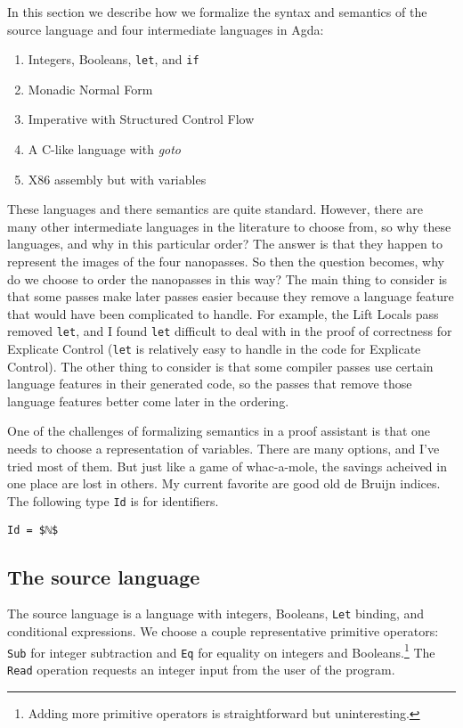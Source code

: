 \documentclass[sigplan,review,dvipsnames,screen,10pt]{acmart}
\begin{document}
In this section we describe how we formalize the syntax and semantics
of the source language and four intermediate languages in Agda:
\begin{enumerate}
\item Integers, Booleans, \texttt{let}, and \texttt{if}
\item Monadic Normal Form
\item Imperative with Structured Control Flow
\item A C-like language with \emph{goto}
\item X86 assembly but with variables
\end{enumerate}
These languages and there semantics are quite standard. However, there
are many other intermediate languages in the literature to choose
from, so why these languages, and why in this particular order?  The
answer is that they happen to represent the images of the four
nanopasses.  So then the question becomes, why do we choose to order
the nanopasses in this way? The main thing to consider is that some
passes make later passes easier because they remove a language feature
that would have been complicated to handle. For example, the Lift
Locals pass removed \texttt{let}, and I found \texttt{let} difficult
to deal with in the proof of correctness for Explicate Control
(\texttt{let} is relatively easy to handle in the code for Explicate
Control). The other thing to consider is that some compiler passes use
certain language features in their generated code, so the passes that
remove those language features better come later in the ordering.

One of the challenges of formalizing semantics in a proof assistant is
that one needs to choose a representation of variables. There are many
options, and I've tried most of them. But just like a game of
whac-a-mole, the savings acheived in one place are lost in others.  My
current favorite are good old de Bruijn indices. The following type
\lstinline{Id} is for identifiers.

\begin{lstlisting}
Id = $ℕ$
\end{lstlisting}

\subsection{The source language}

The source language is a language with integers, Booleans,
\texttt{Let} binding, and conditional expressions. We choose a couple
representative primitive operators: \texttt{Sub} for integer
subtraction and \texttt{Eq} for equality on integers and
Booleans.\footnote{Adding more primitive operators is straightforward
but uninteresting.}  The \texttt{Read} operation requests an integer
input from the user of the program.
\end{document}
